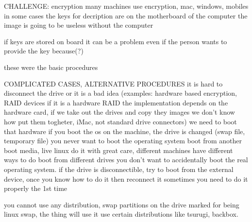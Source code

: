 CHALLENGE: encryption
    many machines use encryption, mac, windows, mobiles 
    in some cases the keys for decription are on the motherboard of the computer 
    the image is going to be useless without the computer 

    if keys are stored on board it can be a problem even if the person wants to provide the key because(?)

these were the basic procedures 

COMPLICATED CASES, ALTERNATIVE PROCEDURES 
    it is hard to disconnect the drive or it is a bad idea (examples: hardware based encryption, RAID devices if it is a hardware RAID the implementation depends on the hardware card, if we take out the drives and copy they images we don't know how put them togheter, iMac, not standard drive connectors)
    we need to boot that hardware
    if you boot the os on the machine, the drive is changed (swap file, temporary file) you never want to boot the operating system
    boot from another boot media, live linux 
        do it with great care, different machines have different ways to do boot from different drives 
        you don't want to accidentally boot the real operating system.
        if the drive is disconnectible, try to boot from the external device, once you know how to do it then reconnect it 
        sometimes you need to do it properly the 1st time 

        you cannot use any distribution, swap partitions on the drive marked for being linux swap, the thing will use it
        use certain distributions like tsurugi, backbox.
\fi



